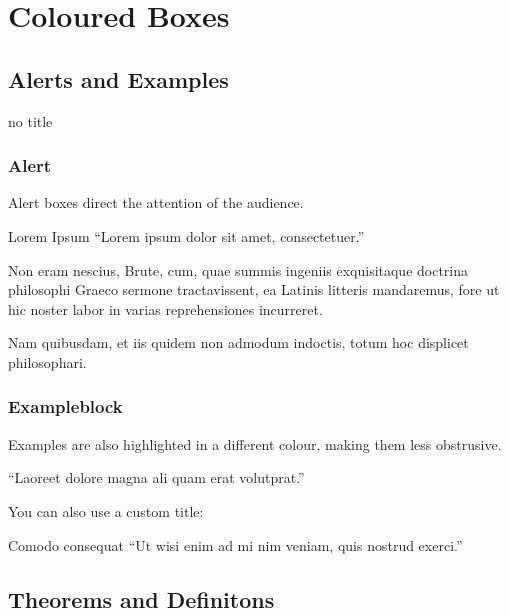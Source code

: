 \documentclass{beamer}
\begin{document}


\section{Coloured Boxes}

\subsection{Alerts and Examples}

\begin{frame}
  no title
\end{frame}


\begin{frame}
  \frametitle{Alert}

  Alert boxes direct the attention of the audience.

  \begin{alertblock}{Lorem Ipsum}
    ``Lorem ipsum dolor sit amet, consectetuer.''
  \end{alertblock}
  
  \pause
  Non eram nescius, Brute, cum, quae summis ingeniis exquisitaque doctrina
  philosophi Graeco sermone tractavissent, ea Latinis litteris mandaremus, fore
  ut hic noster labor in varias reprehensiones incurreret.

  Nam quibusdam, et iis quidem non admodum indoctis, totum hoc displicet philosophari.
\end{frame}

\begin{frame}
  \frametitle{Exampleblock}

  Examples are also highlighted in a different colour, making them less obstrusive.

  \begin{example}
    ``Laoreet dolore magna ali quam erat volutprat.''
  \end{example}

  You can also use a custom title:

  \begin{exampleblock}{Comodo consequat}
    ``Ut wisi enim ad mi nim veniam, quis nostrud exerci.''
  \end{exampleblock}

\end{frame}

\subsection{Theorems and Definitons}
\end{document}
